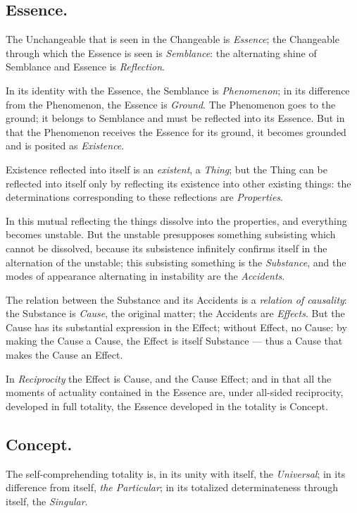 \documentclass[12pt]{book}
\begin{document}
\subsection*{Essence.}

The Unchangeable that is seen in the Changeable is \emph{Essence};
the Changeable through which the Essence is seen is \emph{Semblance}:
the alternating shine of Semblance and Essence is \emph{Reflection}.

In its identity with the Essence, the Semblance is
\emph{Phenomenon}; in its difference from the Phenomenon, the Essence
is \emph{Ground}. The Phenomenon goes to the ground; it belongs to
Semblance and must be reflected into its Essence. But in that the
Phenomenon receives the Essence for its ground, it becomes grounded
and is posited as \emph{Existence}.

Existence reflected into itself is an \emph{existent}, a
\emph{Thing}; but the Thing can be reflected into itself only by
reflecting its existence into other existing things: the
determinations corresponding to these reflections are
\emph{Properties}.

In this mutual reflecting the things dissolve into the properties,
and everything becomes unstable. But the unstable presupposes
something subsisting which cannot be dissolved, because its
subsistence infinitely confirms itself in the alternation of the
unstable; this subsisting something is the \emph{Substance}, and the
modes of appearance alternating in instability are the
\emph{Accidents}.

The relation between the Substance and its Accidents is a
\emph{relation of causality}: the Substance is \emph{Cause}, the
original matter; the Accidents are \emph{Effects}. But the Cause has
its substantial expression in the Effect; without Effect, no Cause:
by making the Cause a Cause, the Effect is itself Substance --- thus
a Cause that makes the Cause an Effect.

In \emph{Reciprocity} the Effect is Cause, and the Cause Effect; and
in that all the moments of actuality contained in the Essence are,
under all-sided reciprocity, developed in full totality, the Essence
developed in the totality is Concept.

\subsection*{Concept.}

The self-comprehending totality is, in its unity with itself, the
\emph{Universal}; in its difference from itself, \emph{the
Particular}; in its totalized determinateness through itself, the
\emph{Singular}.
\end{document}
